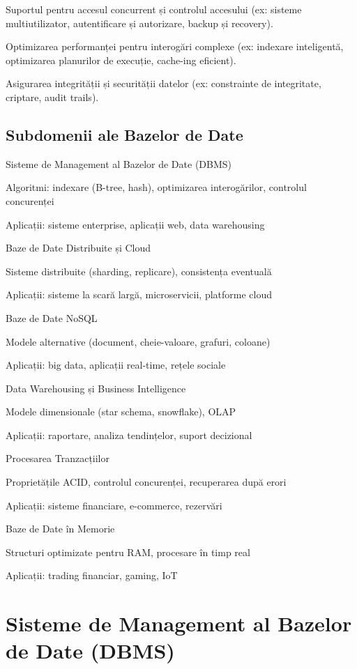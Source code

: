 \documentclass[12pt]{article}
\begin{document}
Suportul pentru accesul concurrent și controlul accesului (ex: sisteme multiutilizator, autentificare și autorizare, backup și recovery).

Optimizarea performanței pentru interogări complexe (ex: indexare inteligentă, optimizarea planurilor de execuție, cache-ing eficient).

Asigurarea integrității și securității datelor (ex: constrainte de integritate, criptare, audit trails).

\subsection*{Subdomenii ale Bazelor de Date}

Sisteme de Management al Bazelor de Date (DBMS)

Algoritmi: indexare (B-tree, hash), optimizarea interogărilor, controlul concurenței

Aplicații: sisteme enterprise, aplicații web, data warehousing

Baze de Date Distribuite și Cloud

Sisteme distribuite (sharding, replicare), consistența eventuală

Aplicații: sisteme la scară largă, microservicii, platforme cloud

Baze de Date NoSQL

Modele alternative (document, cheie-valoare, grafuri, coloane)

Aplicații: big data, aplicații real-time, rețele sociale

Data Warehousing și Business Intelligence

Modele dimensionale (star schema, snowflake), OLAP

Aplicații: raportare, analiza tendințelor, suport decizional

Procesarea Tranzacțiilor

Proprietățile ACID, controlul concurenței, recuperarea după erori

Aplicații: sisteme financiare, e-commerce, rezervări

Baze de Date în Memorie

Structuri optimizate pentru RAM, procesare în timp real

Aplicații: trading financiar, gaming, IoT

\section{Sisteme de Management al Bazelor de Date (DBMS)}
\end{document}
